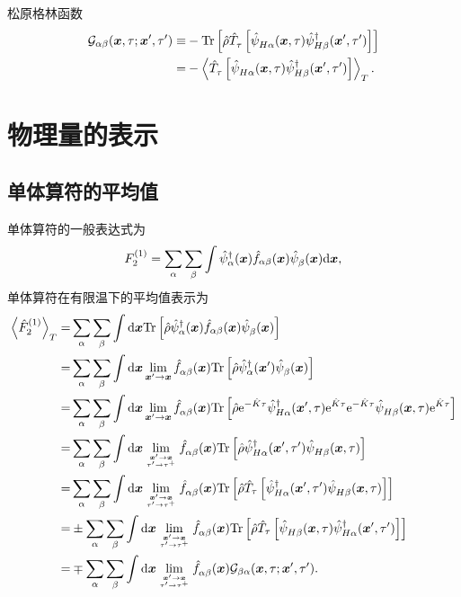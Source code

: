 \begin{definition}{松原格林函数}{}
  \begin{align}
        \mathcal{G}_{\alpha\beta}(\boldsymbol{x},\tau; \boldsymbol{x}',\tau')\equiv& -\mathrm{Tr}\left[ \hat{\rho}\hat{T}^{}_\tau \left[\hat{\psi}^{ }_{H\alpha}(\boldsymbol{x},\tau)\hat{\psi}^\dagger_{H\beta}(\boldsymbol{x}',\tau')\right] \right]\nonumber\\
        =&-\left\langle \hat{T}^{}_\tau \left[ \hat{\psi}_{H\alpha}^{ }(\boldsymbol{x},\tau)\hat{\psi}_{H\beta}^\dagger (\boldsymbol{x}',\tau') \right] \right\rangle_T.
    \end{align}
\end{definition}
\section{物理量的表示}
\subsection{单体算符的平均值}
单体算符的一般表达式为 
\begin{equation}
    F_2^{(1)}=\sum_\alpha\sum_\beta\int\hat{\psi}_\alpha^\dagger (\boldsymbol{x})\hat{f}_{\alpha\beta}(\boldsymbol{x})\hat{\psi}_\beta^{ }(\boldsymbol{x})\mathrm{d} \boldsymbol{x},
\end{equation}
单体算符在有限温下的平均值表示为 
    \begin{align}
        \left\langle \hat{F}_2^{(1)} \right\rangle_T=&\sum_\alpha\sum_\beta\int\mathrm{d} \boldsymbol{x}\mathrm{Tr}\left[ \hat{\rho}\hat{\psi}_\alpha^\dagger (\boldsymbol{x})\hat{f}_{\alpha\beta}(\boldsymbol{x})\hat{\psi}_\beta^{ }(\boldsymbol{x}) \right]\nonumber\\
        =&\sum_\alpha\sum_\beta\int\mathrm{d} \boldsymbol{x}\lim_{\boldsymbol{x}'\to \boldsymbol{x}}\hat{f}^{}_{\alpha\beta}(\boldsymbol{x})\mathrm{Tr}\left[ \hat{\rho}\hat{\psi}_\alpha^\dagger(\boldsymbol{x}')\hat{\psi}_\beta^{ }(\boldsymbol{x}) \right]\nonumber\\
        =&\sum_\alpha\sum_\beta\int\mathrm{d} \boldsymbol{x}\lim_{\boldsymbol{x}'\to \boldsymbol{x}}\hat{f}^{}_{\alpha\beta}(\boldsymbol{x})\mathrm{Tr}\left[ \hat{\rho}\mathrm{e}^{-\hat{K}\tau}\hat{\psi}_{H\alpha}^\dagger (\boldsymbol{x}',\tau)\mathrm{e}^{\hat{K}\tau} \mathrm{e}^{-\hat{K}\tau}\hat{\psi}_{H\beta}^{ }(\boldsymbol{x},\tau)\mathrm{e}^{\hat{K}\tau} \right]\nonumber\\
        =&\sum_\alpha\sum_\beta\int\mathrm{d} \boldsymbol{x}\lim_{\boldsymbol{x}'\to \boldsymbol{x}\atop \tau'\to \tau^+}\hat{f}^{}_{\alpha\beta}(\boldsymbol{x})\mathrm{Tr}\left[ \hat{\rho}\hat{\psi}_{H\alpha}^\dagger (\boldsymbol{x}',\tau')\hat{\psi}_{H\beta}^{ }(\boldsymbol{x},\tau) \right]\nonumber\\
        =&\sum_\alpha\sum_\beta\int\mathrm{d} \boldsymbol{x}\lim_{\boldsymbol{x}'\to \boldsymbol{x}\atop \tau'\to \tau^+}\hat{f}^{}_{\alpha\beta}(\boldsymbol{x})\mathrm{Tr}\left[ \hat{\rho}\hat{T}_{\tau}\left[\hat{\psi}_{H\alpha}^\dagger (\boldsymbol{x}',\tau')\hat{\psi}_{H\beta}^{ }(\boldsymbol{x},\tau)\right] \right]\nonumber\\
        =&\pm\sum_\alpha\sum_\beta\int\mathrm{d} \boldsymbol{x}\lim_{\boldsymbol{x}'\to \boldsymbol{x}\atop \tau'\to \tau^+}\hat{f}^{}_{\alpha\beta}(\boldsymbol{x})\mathrm{Tr}\left[ \hat{\rho}\hat{T}_{\tau}\left[\hat{\psi}_{H\beta}^{ }(\boldsymbol{x},\tau)\hat{\psi}_{H\alpha}^\dagger (\boldsymbol{x}',\tau')\right] \right]\nonumber\\
        =&\mp\sum_\alpha\sum_\beta\int\mathrm{d} \boldsymbol{x}\lim_{\boldsymbol{x}'\to \boldsymbol{x}\atop \tau'\to \tau^+}\hat{f}^{}_{\alpha\beta}(\boldsymbol{x}) \mathcal{G}_{\beta\alpha}(\boldsymbol{x},\tau; \boldsymbol{x}',\tau').
    \end{align}
